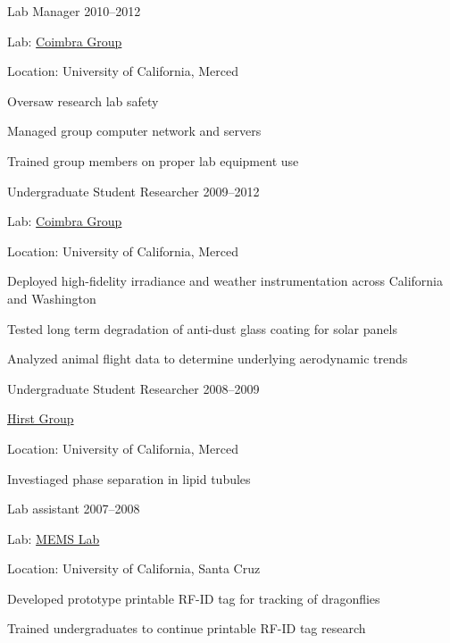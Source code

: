 \documentclass[11pt]{article}
\newcommand{\blankline}{\quad\pagebreak[3]}
\begin{document}
\blankline


Lab Manager \hfill 2010--2012
\begin{innerlist}
    \item Lab: \href{http://coimbra.ucsd.edu/}{Coimbra Group}
    \item Location: University of California, Merced
    \item Oversaw research lab safety
    \item Managed group computer network and servers
    \item Trained group members on proper lab equipment use
\end{innerlist}


\blankline


Undergraduate Student Researcher \hfill 2009--2012
\begin{innerlist}
    \item Lab: \href{http://coimbra.ucsd.edu/}{Coimbra Group}
    \item Location: University of California, Merced
    \item Deployed high-fidelity irradiance and weather instrumentation across California and Washington
    \item Tested long term degradation of anti-dust glass coating for solar panels
    \item Analyzed animal flight data to determine underlying aerodynamic trends
\end{innerlist}


\blankline


Undergraduate Student Researcher \hfill 2008--2009 
\begin{innerlist}
    \item \href{http://faculty.ucmerced.edu/lhirst/}{Hirst Group}
    \item Location: University of California, Merced 
    \item Investiaged phase separation in lipid tubules
\end{innerlist}


\blankline


Lab assistant \hfill 2007--2008
\begin{innerlist}
    \item Lab: \href{http://mems.soe.ucsc.edu/}{MEMS Lab} 
    \item Location: University of California, Santa Cruz
    \item Developed prototype printable RF-ID tag for tracking of dragonflies
    \item Trained undergraduates to continue printable RF-ID tag research
\end{innerlist}
\end{document}
